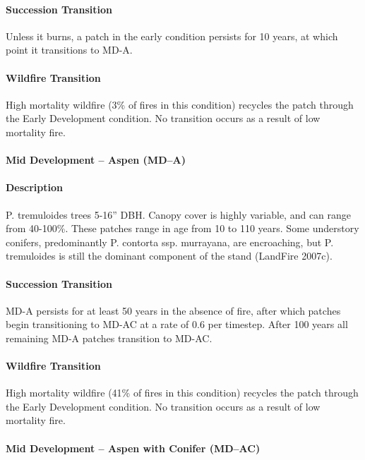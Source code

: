 \paragraph{Succession Transition} Unless it burns, a patch in the early condition persists for 10 years, at which point it transitions to MD-A.

\paragraph{Wildfire Transition} High mortality wildfire (3\% of fires in this condition) recycles the patch through the Early Development condition. No transition occurs as a result of low mortality fire.

\noindent\hrulefill


\paragraph{Mid Development – Aspen (MD–A)}

\paragraph{Description} P. tremuloides trees 5-16'' DBH. Canopy cover is highly variable, and can range from 40-100\%. These patches range in age from 10 to 110 years. Some understory conifers, predominantly P. contorta ssp. murrayana, are encroaching, but P. tremuloides is still the dominant component of the stand (LandFire 2007c).

\paragraph{Succession Transition} MD-A persists for at least 50 years in the absence of fire, after which patches begin transitioning to MD-AC at a rate of 0.6 per timestep. After 100 years all remaining MD-A patches transition to MD-AC. 

\paragraph{Wildfire Transition} High mortality wildfire (41\% of fires in this condition) recycles the patch through the Early Development condition. No transition occurs as a result of low mortality fire.

\noindent\hrulefill

\paragraph{Mid Development – Aspen with Conifer (MD–AC)}


